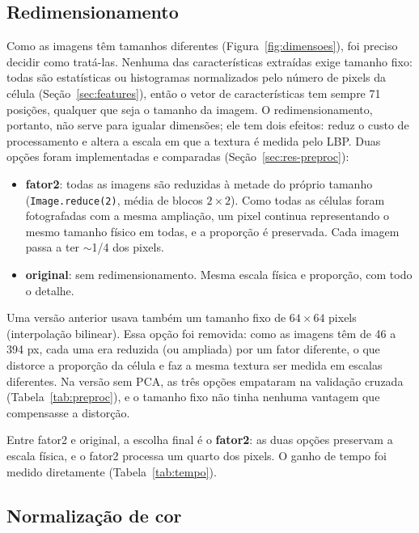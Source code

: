 \documentclass[11pt,a4paper]{article}
\begin{document}
\subsection{Redimensionamento}\label{sec:resize}

Como as imagens têm tamanhos diferentes (Figura~\ref{fig:dimensoes}), foi preciso decidir como
tratá-las. Nenhuma das características extraídas exige tamanho fixo: todas são estatísticas ou
histogramas normalizados pelo número de pixels da célula (Seção~\ref{sec:features}), então o vetor de
características tem sempre 71 posições, qualquer que seja o tamanho da imagem. O redimensionamento,
portanto, não serve para igualar dimensões; ele tem dois efeitos: reduz o custo de processamento e
altera a escala em que a textura é medida pelo LBP. Duas opções foram implementadas e comparadas
(Seção~\ref{sec:res-preproc}):
\begin{itemize}
  \item \textbf{fator2}: todas as imagens são reduzidas à metade do próprio tamanho
        (\texttt{Image.reduce(2)}, média de blocos $2\times2$). Como todas as células foram fotografadas
        com a mesma ampliação, um pixel continua representando o mesmo tamanho físico em todas, e a
        proporção é preservada. Cada imagem passa a ter $\sim$1/4 dos pixels.
  \item \textbf{original}: sem redimensionamento. Mesma escala física e proporção, com todo o detalhe.
\end{itemize}

Uma versão anterior usava também um tamanho fixo de $64\times64$ pixels (interpolação bilinear). Essa
opção foi removida: como as imagens têm de 46 a 394 px, cada uma era reduzida (ou ampliada) por um
fator diferente, o que distorce a proporção da célula e faz a mesma textura ser medida em escalas
diferentes. Na versão sem PCA, as três opções empataram na validação cruzada
(Tabela~\ref{tab:preproc}), e o tamanho fixo não tinha nenhuma vantagem que compensasse a distorção.

Entre fator2 e original, a escolha final é o \textbf{fator2}: as duas opções preservam a escala física,
e o fator2 processa um quarto dos pixels. O ganho de tempo foi medido diretamente
(Tabela~\ref{tab:tempo}).

\subsection{Normalização de cor}\label{sec:normalizacao}
\end{document}

